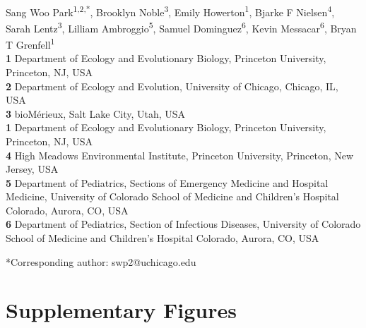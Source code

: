 \documentclass[12pt]{article}
\date{\today}
\begin{document}
\begin{flushleft}{
	\Large
	\textbf{}
}
\newline
\\ 
Sang Woo Park\textsuperscript{1,2,*}, Brooklyn Noble\textsuperscript{3}, Emily Howerton\textsuperscript{1}, Bjarke F Nielsen\textsuperscript{4}, Sarah Lentz\textsuperscript{3}, Lilliam Ambroggio\textsuperscript{5}, Samuel Dominguez\textsuperscript{6}, Kevin Messacar\textsuperscript{6}, Bryan T Grenfell\textsuperscript{1}
\\
\bigskip
\textbf{1} Department of Ecology and Evolutionary Biology, Princeton University, Princeton, NJ, USA
\\
\textbf{2} Department of Ecology and Evolution, University of Chicago, Chicago, IL, USA
\\
\textbf{3} bioMérieux, Salt Lake City, Utah, USA
\\
\textbf{1} Department of Ecology and Evolutionary Biology, Princeton University, Princeton, NJ, USA
\\
\textbf{4} High Meadows Environmental Institute, Princeton University, Princeton, New Jersey, USA
\\
\textbf{5} Department of Pediatrics, Sections of Emergency Medicine and Hospital Medicine, University of Colorado School of Medicine and Children's Hospital Colorado, Aurora, CO, USA
\\
\textbf{6} Department of Pediatrics, Section of Infectious Diseases, University of Colorado School of Medicine and Children's Hospital Colorado, Aurora, CO, USA
\\
\bigskip

*Corresponding author: swp2@uchicago.edu
\bigskip
\end{flushleft} 

\pagebreak

\setcounter{figure}{0}
\setcounter{equation}{0}
\renewcommand{\thefigure}{S\arabic{figure}}
\renewcommand{\theequation}{S\arabic{equation}}

\section*{Supplementary Figures}
\end{document}

